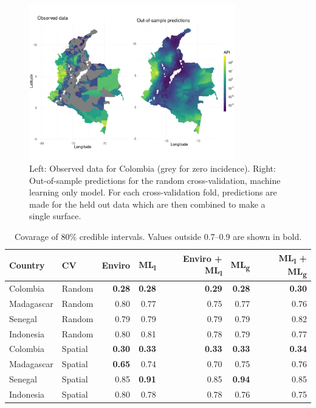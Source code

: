 \documentclass[review]{elsarticle}
\begin{document}



\begin{figure}
\centering
\includegraphics[trim={0 30mm 0 40mm}, width = 0.8\textwidth]{figs/col_obs_pred_map_ml.png} %
\caption{
  Left: Observed data for Colombia (grey for zero incidence). Right: Out-of-sample predictions for the random cross-validation, machine learning only model. For each cross-validation fold, predictions are made for the held out data which are then combined to make a single surface.
}
\label{f:map}
\end{figure}


\begin{table}[h!]
\caption{Covarage of 80\% credible intervals. Values outside 0.7--0.9 are shown in bold.}
\centering
\begin{tabular}{llrrrrr}
Country &  CV & Enviro & ML\textsubscript{l} &  Enviro + ML\textsubscript{l} & ML\textsubscript{g} & ML\textsubscript{l} + ML\textsubscript{g} \\
\hline 
 Colombia & Random & \textbf{0.28} & \textbf{0.28} & \textbf{0.29} & \textbf{0.28} & \textbf{0.30} \\
 Madagascar &  Random & 0.80 & 0.77& 0.75& 0.77& 0.76 \\
 Senegal & Random &0.79 & 0.79& 0.79& 0.79& 0.82 \\
 Indonesia & Random &0.80 & 0.81& 0.78& 0.79& 0.77  \\
 Colombia &  Spatial & \textbf{0.30} & \textbf{0.33}  & \textbf{0.33} & \textbf{0.33} & \textbf{0.34}  \\
 Madagascar & Spatial & \textbf{0.65} & 0.74& 0.70& 0.75 & 0.76   \\
 Senegal & Spatial & 0.85 & \textbf{0.91}& 0.85& \textbf{0.94} & 0.85  \\
  Indonesia & Spatial & 0.80 & 0.78& 0.78& 0.76& 0.75  \\
\end{tabular}
\label{t:coverage}
\end{table}
\end{document}
